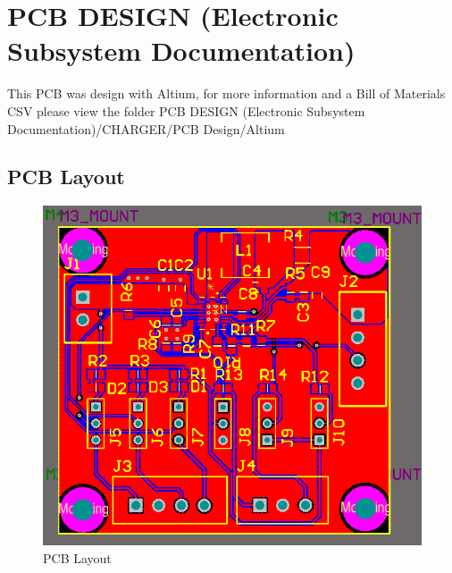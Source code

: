 \documentclass[a4paper, 10pt]{IEEEconf}
\begin{document}

\section{PCB DESIGN (Electronic Subsystem Documentation)}
This PCB was design with Altium, for more information and a Bill of Materials CSV please view the folder PCB DESIGN (Electronic Subsystem Documentation)/CHARGER/PCB Design/Altium


\subsection{PCB Layout}
\begin{figure}[H]
  \includegraphics[width=\linewidth, center]{images/PCBLayout}
  \caption{PCB Layout}
  \label{fig:PCB Layout}
\end{figure}

\end{document}
